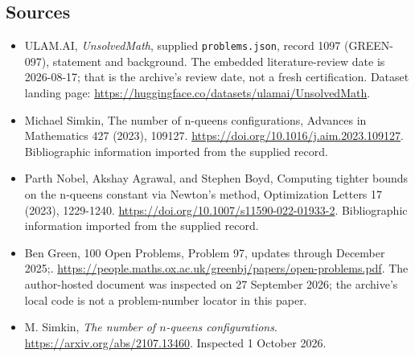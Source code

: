 \documentclass[11pt,a4paper]{article}
\begin{document}
\subsection{Sources}

{\small

\begin{itemize}

\item[\hypertarget{source:1097:1}{S1}] ULAM.AI, \emph{UnsolvedMath}, supplied \texttt{problems.json}, record 1097 (GREEN-097), statement and background. The embedded literature-review date is 2026-08-17; that is the archive’s review date, not a fresh certification. Dataset landing page: \url{https://huggingface.co/datasets/ulamai/UnsolvedMath}.

\item[\hypertarget{source:1097:2}{S2}] Michael Simkin, The number of n-queens configurations, Advances in Mathematics 427 (2023), 109127. \url{https://doi.org/10.1016/j.aim.2023.109127}. Bibliographic information imported from the supplied record.

\item[\hypertarget{source:1097:3}{S3}] Parth Nobel, Akshay Agrawal, and Stephen Boyd, Computing tighter bounds on the n-queens constant via Newton's method, Optimization Letters 17 (2023), 1229-1240. \url{https://doi.org/10.1007/s11590-022-01933-2}. Bibliographic information imported from the supplied record.

\item[\hypertarget{source:1097:4}{S4}] Ben Green, 100 Open Problems, Problem 97, updates through December 2025;. \url{https://people.maths.ox.ac.uk/greenbj/papers/open-problems.pdf}. The author-hosted document was inspected on 27 September 2026; the archive’s local code is not a problem-number locator in this paper.

\item[E1] M. Simkin, \emph{The number of $n$-queens configurations}. \url{https://arxiv.org/abs/2107.13460}. Inspected 1 October 2026.

\end{itemize}

}

\label{end:1097}
\end{document}
